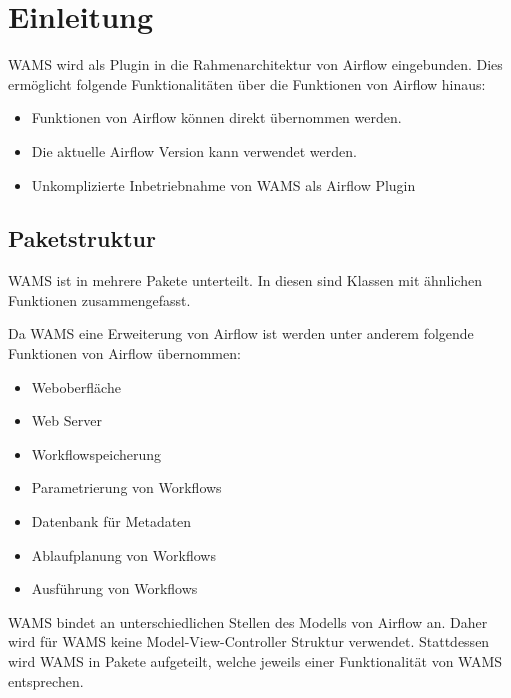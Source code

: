 \chapter{Einleitung}
WAMS wird als Plugin in die Rahmenarchitektur von Airflow eingebunden.
Dies ermöglicht folgende Funktionalitäten über die Funktionen von Airflow hinaus: 
\begin{itemize}
    \item Funktionen von Airflow können direkt übernommen werden.
    \item Die aktuelle Airflow Version kann verwendet werden.
    \item Unkomplizierte Inbetriebnahme von WAMS als Airflow Plugin
\end{itemize}
%

\section{Paketstruktur}

WAMS ist in mehrere Pakete unterteilt. In diesen sind Klassen mit ähnlichen Funktionen zusammengefasst.


Da WAMS eine Erweiterung von Airflow ist werden unter anderem folgende Funktionen von Airflow übernommen:
\begin{itemize}
    \item Weboberfläche
    \item Web Server
    \item Workflowspeicherung
    \item Parametrierung von Workflows
    \item Datenbank für Metadaten
    \item Ablaufplanung von Workflows
    \item Ausführung von Workflows
\end{itemize}
WAMS bindet an unterschiedlichen Stellen des Modells von Airflow an.
Daher wird für WAMS keine Model-View-Controller Struktur verwendet.
Stattdessen wird WAMS in Pakete aufgeteilt, welche jeweils einer Funktionalität von WAMS entsprechen.

